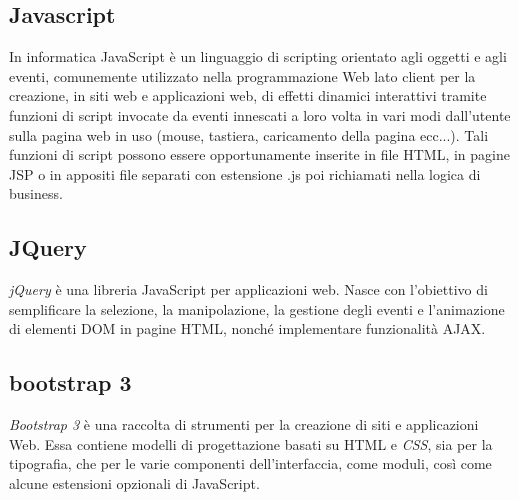 \subsection{Javascript}
In informatica JavaScript è un linguaggio di scripting orientato agli oggetti e agli eventi, comunemente utilizzato nella programmazione Web lato client per la creazione, in siti web e applicazioni web, di effetti dinamici interattivi tramite funzioni di script invocate da eventi innescati a loro volta in vari modi dall'utente sulla pagina web in uso (mouse, tastiera, caricamento della pagina ecc...). Tali funzioni di script possono essere opportunamente inserite in file HTML, in pagine JSP o in appositi file separati con estensione .js poi richiamati nella logica di business.

\subsection{JQuery}
\textit{jQuery} è una libreria JavaScript per applicazioni web. Nasce con l'obiettivo di semplificare la selezione, la manipolazione, la gestione degli eventi e l'animazione di elementi DOM in pagine HTML, nonché implementare funzionalità AJAX.

\subsection{bootstrap 3}
\textit{Bootstrap 3} è una raccolta di strumenti per la creazione di siti e applicazioni Web. Essa contiene modelli di progettazione basati su HTML e \textit{CSS}, sia per la tipografia, che per le varie componenti dell’interfaccia, come moduli, così come alcune estensioni opzionali di JavaScript.